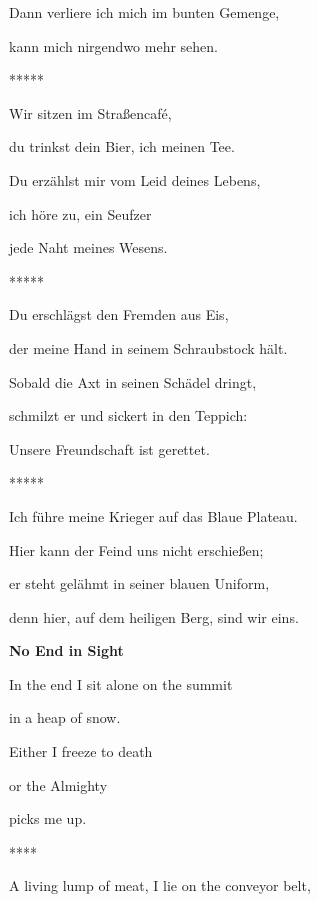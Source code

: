 Dann verliere ich mich im bunten Gemenge,

kann mich nirgendwo mehr sehen.


\bigskip

*****


\bigskip

Wir sitzen im Straßencafé,

du trinkst dein Bier, ich meinen Tee.

Du erzählst mir vom Leid deines Lebens,

ich höre zu, ein Seufzer

jede Naht meines Wesens.


\bigskip

*****


\bigskip

Du erschlägst den Fremden aus Eis, 

der meine Hand in seinem Schraubstock hält.

Sobald die Axt in seinen Schädel dringt,

schmilzt er und sickert in den Teppich:

Unsere Freundschaft ist gerettet.


\bigskip

*****


\bigskip

Ich führe meine Krieger auf das Blaue Plateau.

Hier kann der Feind uns nicht erschießen;

er steht gelähmt in seiner blauen Uniform, 

denn hier, auf dem heiligen Berg, sind wir eins.


\bigskip


\bigskip

\clearpage
\bigskip

{\bfseries
No End in Sight}


\bigskip


\bigskip

In the end I sit alone on the summit

in a heap of snow.

Either I freeze to death

or the Almighty

picks me up.


\bigskip


\bigskip

****


\bigskip

A living lump of meat, I lie on the conveyor belt,

